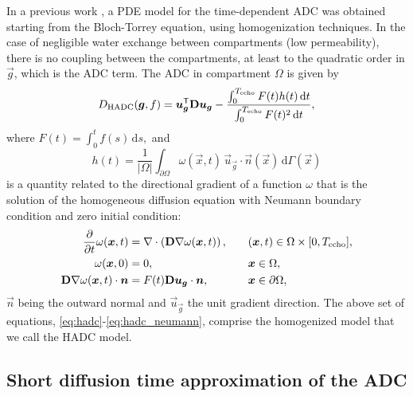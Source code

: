 \documentclass[a4paper]{article}
\begin{document}
In a previous work \cite{schiavi2016}, a PDE model for the time-dependent ADC was obtained starting from the Bloch-Torrey equation, using homogenization techniques. In the case of negligible water exchange between compartments (low permeability), there is no coupling between the compartments, at least to the quadratic order in $\vec{g}$, which is the ADC term. The ADC in compartment $\Omega$ is given by
\begin{equation} \label{eq:hadc}
    D_\text{HADC}(\bm{g}, f) = \bm{u}_{\bm{g}}^{\mathsf{T}} \mathbf{D} \bm{u}_{\bm{g}} - \frac{\int_0^{T_\text{echo}} F(t) h(t) \, \mathrm{d}t}{\int_0^{T_\text{echo}} F(t)^2 \, \mathrm{d} t} ,
\end{equation}
where $F(t) = \int_0^t f(s) \, \mathrm{d}s,$ and
\begin{equation} \label{eq:hadc_h_def}
    h(t) = \frac{1}{|\Omega|} \int_{\partial \Omega} \omega(\vec{x}, t) \, \vec{u}_{\vec{g}} \cdot \vec{n}(\vec{x}) \, \mathrm{d} \Gamma(\vec{x})
\end{equation}
is a quantity related to the directional gradient of a function $\omega$ that is the solution of the homogeneous diffusion equation with Neumann boundary condition and zero initial condition:
\begin{alignat}{2}
    \frac{\partial}{\partial t} \omega(\bm{x}, t)  & = \nabla \cdot \left(\mathbf{D} \nabla \omega(\bm{x}, t)\right), \quad &  & (\bm{x}, t) \in \Omega \times [0, T_\text{echo}], \label{eq:hadc_pde} \\
    \omega(\bm{x}, 0)                              & = 0, \quad                                                           &  & \bm{x} \in \Omega, \label{eq:hadc_initial}                            \\
    \mathbf{D} \nabla \omega(\bm{x}, t) \cdot \bm{n} & = F(t) \mathbf{D} \bm{u}_{\bm{g}} \cdot \bm{n}, \quad                &  & \bm{x} \in \partial \Omega, \label{eq:hadc_neumann}
\end{alignat}
$\vec{n}$ being the outward normal and $\vec{u}_{\vec{g}}$ the unit gradient direction. The above set of equations, \eqref{eq:hadc}-\eqref{eq:hadc_neumann}, comprise the homogenized model that we call the HADC model.



\subsection{Short diffusion time approximation of the ADC}
\end{document}
